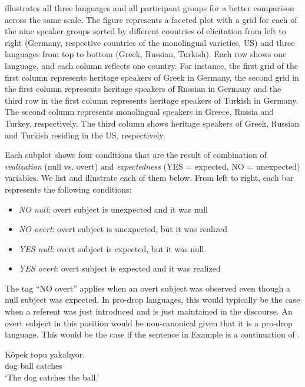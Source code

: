 \documentclass[output=paper,colorlinks,citecolor=brown]{langscibook}
\begin{document}
 illustrates all three languages and all participant groups for a better comparison across the same scale. 
The figure represents a faceted plot with a grid for each of the nine speaker groups sorted by different countries of elicitation from left to right (Germany, respective countries of the monolingual varieties, US) and three languages from top to bottom (Greek, Russian, Turkish). 
Each row shows one language, and each column reflects one country. 
For instance, the first grid of the first column represents heritage speakers of Greek in Germany, the second grid in the first column represents heritage speakers of Russian in Germany and the third row in the first column represents heritage speakers of Turkish in Germany. 
The second column represents monolingual speakers in Greece, Russia and Turkey, respectively.
The third column shows heritage speakers of Greek, Russian and Turkish residing in the US, respectively.

Each subplot shows four conditions that are the result of combination of \textit{realization} (null vs. overt) and \textit{expectedness} (YES = expected, NO = unexpected) variables. We list and illustrate each of them below.
From left to right, each bar represents the following conditions:
\pagebreak
\begin{itemize}
    \item \textit{NO null}: overt subject is unexpected and it was null
    \item \textit{NO overt}: overt subject is unexpected, but it was realized
    \item \textit{YES null}: overt subject is expected, but it was null
    \item \textit{YES overt}: overt subject is expected and it was realized
\end{itemize}

The tag ``NO overt'' applies when an overt subject was observed even though a null subject was expected. In pro-drop languages, this would typically be the case when a referent was just introduced and is just maintained in the discourse. An overt subject in this position would be non-canonical given that it is a pro-drop language. This would be the case if the sentence in Example  is a continuation of .

\ea \label{ex:oezsoy:NO overt}
\gll Köpek topu yakalıyor.\\ 
	dog ball catches\\
\glt `The dog catches the ball.'
\z
{}
\end{document}
